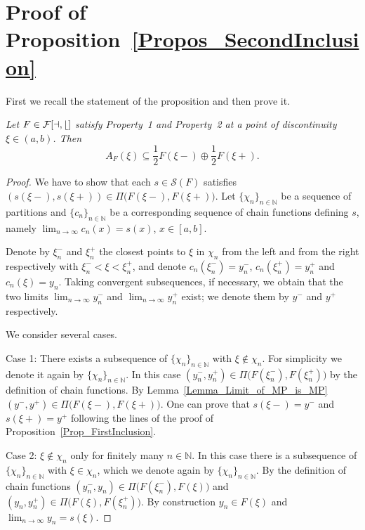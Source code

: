 \documentclass[final,3p,mathptmx]{article}%
\newcommand{\N}{{\mathbb N}}
\newcommand{\Pair}[2]{\Pi \big ( {#1},{#2} \big )}
\newcommand{\calF}{\cal{F}[a,b]}
\newcommand{\setMS}{\mathcal{S}(F)}
\newtheorem{propos}[remark]{Proposition}
\begin{document}
{{{%

\section{Proof of Proposition~\ref{Propos_SecondInclusion}}
First we recall the statement of the proposition and then prove it.
\medskip


\textit{
	Let $F \in \calF$ satisfy Property~1 and Property~2 at a point of discontinuity $\xi \in (a,b)$. Then 
	$$ A_F(\xi)  \subseteq \frac{1}{2} F(\xi-)\oplus \frac{1}{2} F(\xi+).$$
}
\begin{proof}
	We have to show that each $s\in\setMS $ satisfies	$( s(\xi-), s(\xi+) ) \in \Pair{F(\xi-)}{F(\xi+)}$. 
	Let $\{ \chi_n \}_{n\in \N}$ be a sequence of partitions and $\{ c_n\}_{n\in \N}$ be a corresponding sequence of chain 
	functions defining $s$, namely $ \displaystyle \lim_{n \to \infty } c_n(x) =s(x)$, $x \in [a,b]$.
	
	\noindent %
	
	Denote by $\xi_n^-$ and $\xi_n^+$ the closest points to $\xi$ in $\chi_n$ from the left and from the right respectively with ${\xi_n^- < \xi < \xi_n^+}$, and denote ${c_n(\xi_n^-)=y_n^-}$, ${c_n(\xi_n^+)=y_n^+}$ and $c_n(\xi) = y_n$. 
	Taking convergent subsequences, if necessary, we obtain that the two limits
	$\displaystyle \lim_{n \to \infty } y_n^-$ and $\displaystyle\lim_{n \to \infty } y_n^+$
	exist; we denote them by $y^-$ and $y^+$ respectively. %
	
	We consider several cases.
	\smallskip
	
	Case 1: There exists a subsequence of $\{\chi_n\}_{n \in \N}$ with $\xi \notin \chi_n$. For simplicity we denote it again by $\{\chi_n\}_{n \in \N}$. 
	In this case ${(y_n^-, y_n^+) \in \Pair{F(\xi_n^-)}{F(\xi_n^+)} }$ by the definition of chain functions.  
	By Lemma~\ref{Lemma_Limit_of_MP_is_MP} $(y^-, y^+) \in \Pair{F(\xi-)}{F(\xi+)}$.
	One can prove that $s(\xi-)=y^-$ and $s(\xi+)=y^+$ following the lines of the proof of Proposition~\ref{Prop_FirstInclusion}.
	\smallskip
	
	Case 2: $\xi \notin \chi_n$ only for finitely many $n \in \N$. In this case there is a subsequence of $\{\chi_n\}_{n \in \N}$ with ${\xi \in \chi_n}$, which we denote again by $\{\chi_n\}_{n \in \N}$. 
	By the definition of chain functions
	${(y_n^-, y_n) \in \Pair{F(\xi_n^-)}{F(\xi)}}$ and ${(y_n, y_n^+) \in \Pair{F(\xi)}{F(\xi_n^+)}}$.
	By construction $y_n \in F(\xi)$ and $\displaystyle \lim_{n \to \infty } y_n = s(\xi)$.
	

\end{proof}}}}
\end{document}
